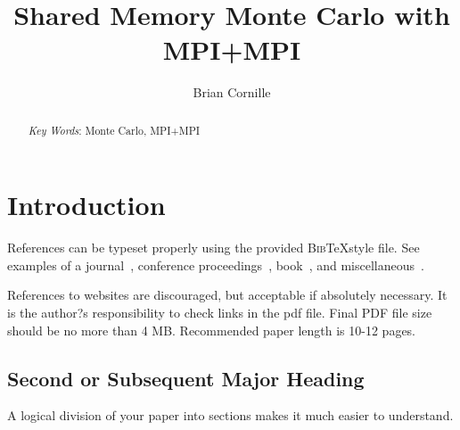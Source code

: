 \documentclass{mc2015}
\begin{document}
\title{Shared Memory Monte Carlo with MPI+MPI}

\author{Brian Cornille}


\maketitle

\begin{abstract}

\emph{Key Words}: Monte Carlo, MPI+MPI
\end{abstract}

\section{Introduction}

References can be typeset properly using the provided \textsc{Bib}\TeX style
file. See examples of a journal~\cite{journal}, conference
proceedings~\cite{proceedings}, book~\cite{book}, and
miscellaneous~\cite{misc}.

References to websites are discouraged, but acceptable if absolutely necessary.  It is the author?s responsibility to check links in the pdf file.
Final PDF file size should be no more than 4 MB.  Recommended paper length is 10-12 pages.

\subsection{Second or Subsequent Major Heading}

A logical division of your paper into sections makes it much easier to understand.    
\end{document}
